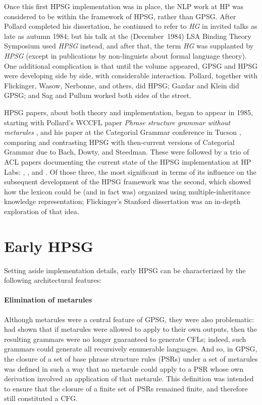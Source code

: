 \documentclass[output=paper,biblatex,babelshorthands,newtxmath,draftmode,colorlinks,citecolor=brown]{langscibook}
\begin{document}
Once this first HPSG implementation was in place, the NLP work at HP was considered to be within the
framework of HPSG, rather than GPSG. After Pollard completed his dissertation, he continued to refer
to \emph{HG} in invited talks as late as autumn 1984; but his talk at the (December~1984) LSA
Binding Theory Symposium used \emph{HPSG} instead, and after that, the term \emph{HG} was supplanted
by \emph{HPSG} (except in publications by non-linguists about formal language theory). One
additional complication is that until the \citet*{GKPS85a} volume appeared, GPSG and HPSG were
developing side by side, with considerable interaction.  Pollard, together with Flickinger, Wasow,
Nerbonne, and others, did HPSG; Gazdar and Klein did GPSG; and Sag and Pullum worked both sides of
the street.

HPSG papers, about both theory and implementation, began to appear in 1985, starting with Pollard's
WCCFL paper \emph{Phrase structure grammar without metarules} \citep{Pollard85a-u}, and his paper at
the Categorial Grammar conference in Tucson \citep{Pollard88a}, comparing and contrasting HPSG with
then-current versions of Categorial Grammar due to Bach, Dowty, and Steedman. These were followed by
a trio of ACL papers documenting the current state of the HPSG implementation at HP Labs:
\citet{creary-pollard:1985:ACL}, \citet*{FPW85a}, and \citet{PP85}. Of those three, the most
significant in terms of its influence on the subsequent development of the HPSG framework was the
second, which showed how the lexicon could be (and in fact was) organized using multiple-inheritance
knowledge representation; Flickinger's Stanford dissertation \citep{Flickinger87} was an in-depth
exploration of that idea.

\section{Early HPSG}
\label{evolution:sec-early-hpsg}

Setting aside implementation details, early HPSG can be characterized by the following architectural features:

\paragraph*{Elimination of metarules} Although metarules were a central feature of GPSG, they were also problematic: \citet{UszPet1982} had shown  that if metarules were allowed to apply to their own outputs, then the resulting grammars were no longer guaranteed to generate CFLs; indeed, such grammars could generate all recursively enumerable languages. And so, in GPSG, the closure of a set of base phrase structure rules (PSRs) under a set of metarules was defined in such a way that no metarule could apply to a PSR whose own derivation involved an application of that metarule. This definition was intended to ensure that the closure of a finite set of PSRs remained finite, and therefore still constituted a CFG.
\end{document}
